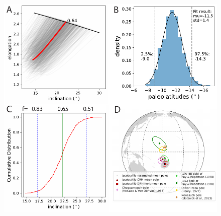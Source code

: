 \documentclass[draft]{agujournal2019}
\begin{document}
\begin{figure}[h!]
\centering
\includegraphics[width=\textwidth]{EI_results.pdf}

\end{figure}
\end{document}

